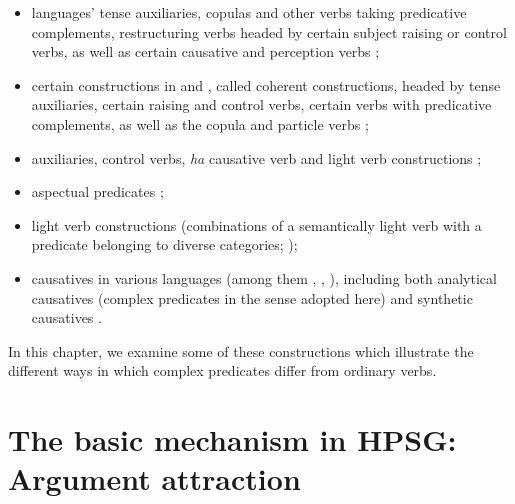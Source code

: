 \begin{itemize}
	
	\item {} languages' tense auxiliaries, copulas and other verbs taking predicative complements, restructuring verbs headed by certain subject raising or control verbs, as well as certain causative and perception verbs \citep*{abeille1994complementation, abeille2000french, abeille2001deux, abeille2001varieties, AG2002b-u, AG2010, abeille1995doublestructure, AGMS98a, AGS1998, Monachesi98a, aguila20};
	
	\item certain constructions in  and , called coherent constructions, headed by tense auxiliaries, certain raising and control verbs, certain verbs with predicative complements, as well as the copula and particle verbs \citep{HN89b, HN94a, Rentier94, Kiss94, Kiss95a, BvN98a, HN98a, Kathol98b, Kathol2000a, Meurers2000b, DM2002, dKM2001a,  Mueller2002b, Mueller2003a, muller2018clause};
	
	\item {} auxiliaries, control verbs, \emph{ha} causative verb and light verb constructions \citep{ Sells1991, Ryu:93, Chung98a-u, lee2001argument, choi2001mixed, Yoo2003, Kim2016a-u};
	
	\item {} aspectual predicates \citep{poornima2009hindi}; 
	
	\item {} light verb constructions (combinations of a semantically light verb with a predicate belonging to diverse categories; \citealt{bonami2010persian, MuellerPersian, bonami2015diversity});   
	
	\item causatives in various languages (among them , , ), including both analytical causatives (complex predicates in the sense adopted here) and synthetic causatives \citep{Webelhuth98a-u}. 
	
\end{itemize}

\noindent
In this chapter, we examine some of these constructions which illustrate the different ways in which complex predicates differ from ordinary verbs.


\section{The basic mechanism in HPSG: Argument attraction}\label{GSsection2}
\label{complex-predicates-sec-argument-attraction}


